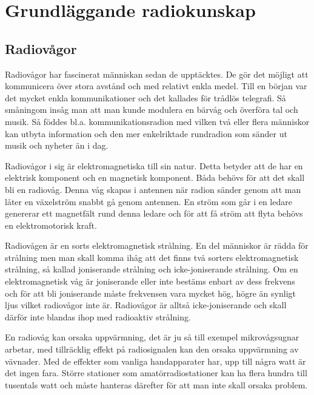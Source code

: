 \documentclass[12ypt,swedish,a4paper]{report}
\begin{document}
\setlength{\parskip}{1em plus 0.3em minus 0.1em}
\setlength{\parindent}{0pt}

\pagestyle{fancy}

\lhead{\nouppercase{\leftmark}}
\chead{}
\rhead{\nouppercase{\rightmark}}

\cfoot{\thepage}

\renewcommand{\headrulewidth}{0.2pt}
\renewcommand{\footrulewidth}{0.2pt}

\chapter{Grundläggande radiokunskap}

\section{Radiovågor}

Radiovågor har fascinerat människan sedan de upptäcktes. De gör det möjligt att kommunicera över stora avstånd och med relativt enkla medel. Till en början var det mycket enkla kommunikationer och det kallades för trådlös telegrafi. Så småningom insåg man att man kunde modulera en bärvåg och överföra tal och musik. Så föddes bl.a. kommunikationsradion med vilken två eller flera människor kan utbyta information och den mer enkelriktade rundradion som sänder ut musik och nyheter än i dag.

Radiovågor i sig är elektromagnetiska till sin natur. Detta betyder att de har en elektrisk komponent och en magnetisk komponent. Båda behövs för att det skall bli en radiovåg. Denna våg skapas i antennen när radion sänder genom att man låter en växelström snabbt gå genom antennen. En ström som går i en ledare genererar ett magnetfält rund denna ledare och för att få ström att flyta behövs en elektromotorisk kraft.

Radiovågen är en sorts elektromagnetisk strålning. En del människor är rädda för strålning men man skall komma ihåg att det finns två sorters elektromagnetisk strålning, så kallad joniserande strålning och icke-joniserande strålning. Om en elektromagnetisk våg är joniserande eller inte bestäms enbart av dess frekvens och för att bli joniserande måste frekvensen vara mycket hög, högre än synligt ljus vilket radiovågor inte är. Radiovågor är alltså icke-joniserande och skall därför inte blandas ihop med radioaktiv strålning.

En radiovåg kan orsaka uppvärmning, det är ju så till exempel mikrovågsugnar arbetar, med tillräcklig effekt på radiosignalen kan den orsaka uppvärmning av vävnader. Med de effekter som vanliga handapparater har, upp till några watt är det ingen fara. Större stationer som amatörradiostationer kan ha flera hundra till tusentals watt och måste hanteras därefter för att man inte skall orsaka problem.
\end{document}
